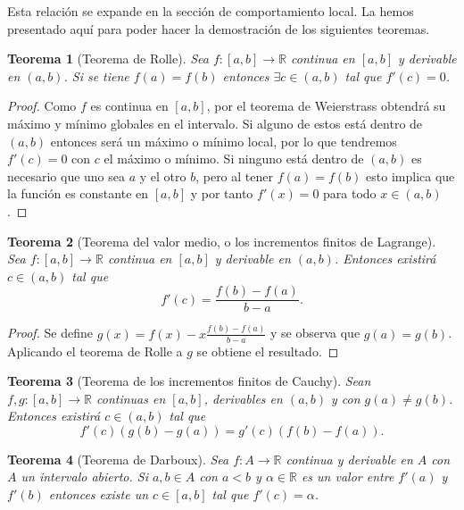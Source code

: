 \documentclass{article}
\newtheorem{theorem}{Teorema}
\newcommand{\reales}{\mathbb{R}}
\begin{document}
Esta relación se expande en la sección de comportamiento local. La hemos presentado aquí para poder hacer la demostración de los siguientes teoremas.

\begin{theorem}[Teorema de Rolle]
	Sea $f: [a, b] \rightarrow \reales$ continua en $[a, b]$ y derivable en $(a, b)$. Si se tiene $f(a) = f(b)$ entonces $\exists c \in (a, b)$ tal que $f'(c) = 0$.
\end{theorem}
\begin{proof}
	Como $f$ es continua en $[a, b]$, por el teorema de Weierstrass obtendrá su máximo y mínimo globales en el intervalo. Si alguno de estos está dentro de $(a, b)$ entonces será un máximo o mínimo local, por lo que tendremos $f'(c) = 0$ con $c$ el máximo o mínimo. Si ninguno está dentro de $(a, b)$ es necesario que uno sea $a$ y el otro $b$, pero al tener $f(a) = f(b)$ esto implica que la función es constante en $[a, b]$ y por tanto $f'(x) = 0$ para todo $x \in (a, b)$.
\end{proof}

\begin{theorem}[Teorema del valor medio, o los incrementos finitos de Lagrange]
	Sea $f: [a, b] \rightarrow \reales$ continua en $[a, b]$ y derivable en $(a, b)$. Entonces existirá $c \in (a, b)$ tal que
	\begin{equation*}
		f'(c) = \frac{f(b) - f(a)}{b - a}.
	\end{equation*}
\end{theorem}
\begin{proof}
	Se define $g(x) = f(x) - x\frac{f(b) - f(a)}{b - a}$ y se observa que $g(a) = g(b)$. Aplicando el teorema de Rolle a $g$ se obtiene el resultado.
\end{proof}

\begin{theorem}[Teorema de los incrementos finitos de Cauchy]
	Sean $f,g: [a, b] \rightarrow \reales$ continuas en $[a, b]$, derivables en $(a, b)$ y con $g(a) \neq g(b)$. Entonces existirá $c \in (a, b)$ tal que
	\begin{equation*}
		f'(c)(g(b) - g(a)) = g'(c)(f(b) - f(a)).
	\end{equation*}
\end{theorem}

\begin{theorem}[Teorema de Darboux]
	Sea $f:A \rightarrow \reales$ continua y derivable en $A$ con $A$ un intervalo abierto. Si $a,b \in A$ con $a<b$ y $\alpha \in \reales$ es un valor entre $f'(a)$ y $f'(b)$ entonces existe un $c \in [a, b]$ tal que $f'(c) = \alpha$.
\end{theorem}
\end{document}

